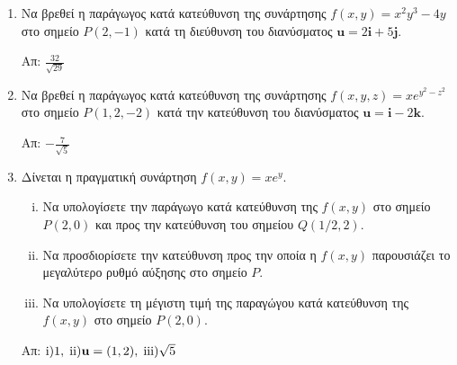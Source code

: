 


\pagestyle{askhseis}
\everymath{\displaystyle}





\begin{center}
  \minibox{\large\bfseries \textcolor{Col1}{Ασκήσεις στην Παράγωγο κατά Κατεύθυνση}}
\end{center}

\vspace{\baselineskip}

\begin{enumerate}
  \item Να βρεθεί η παράγωγος κατά κατεύθυνση της συνάρτησης $ f(x,y) = x^{2}y^{3}-4y $ 
    στο σημείο $ P(2,-1) $ κατά τη διεύθυνση του διανύσματος 
    $ \mathbf{u}=2 \mathbf{i}+5 \mathbf{j} $.	

    \hfill Απ: $ \frac{32}{\sqrt{ 29 }} $ 

  \item Να βρεθεί η παράγωγος κατά κατεύθυνση της συνάρτησης 
    $ f(x,y,z) = xe^{y^{2}-z^{2}} $ στο σημείο $ P(1,2,-2) $ κατά την κατεύθυνση 
    του διανύσματος $ \mathbf{u} = \mathbf{i}-2 \mathbf{k} $.

    \hfill Απ: $ - \frac{7}{\sqrt{ 5 }} $ 

  \item Δίνεται η πραγματική συνάρτηση $ f(x,y) = xe^{y} $.
    \begin{enumerate}[i)]
      \item Να υπολογίσετε την παράγωγο κατά κατεύθυνση της $ f(x,y) $ στο σημείο 
        $ P(2,0) $ και προς την κατεύθυνση του σημείου $ Q({1}/{2}, 2) $.
      \item Να προσδιορίσετε την κατεύθυνση προς την οποία η $ f(x,y) $ παρουσιάζει το
        μεγαλύτερο ρυθμό αύξησης στο σημείο $ P $.
      \item Να υπολογίσετε τη μέγιστη τιμή της παραγώγου κατά κατεύθυνση της 
        $ f(x,y) $ στο σημείο $ P(2,0) $.
    \end{enumerate}

    \hfill Απ: $ \rm{i}) 1, \; ii) \mathbf{u} = (1,2), \; iii) \sqrt{ 5 } $ 

\end{enumerate}


